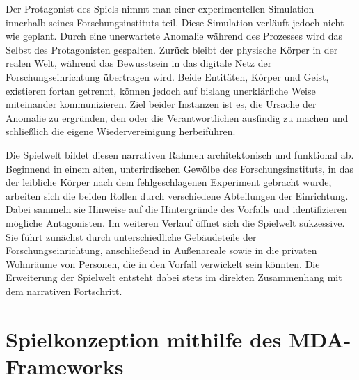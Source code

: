 Der Protagonist des Spiels nimmt man einer experimentellen Simulation innerhalb seines Forschungsinstituts teil. Diese Simulation verläuft jedoch nicht wie geplant. Durch eine unerwartete Anomalie während des Prozesses wird das Selbst des Protagonisten gespalten. Zurück bleibt der physische Körper in der realen Welt, während das Bewusstsein in das digitale Netz der Forschungseinrichtung übertragen wird. Beide Entitäten, Körper und Geist, existieren fortan getrennt, können jedoch auf bislang unerklärliche Weise miteinander kommunizieren. Ziel beider Instanzen ist es, die Ursache der Anomalie zu ergründen, den oder die Verantwortlichen ausfindig zu machen und schließlich die eigene Wiedervereinigung herbeiführen.

Die Spielwelt bildet diesen narrativen Rahmen architektonisch und funktional ab. Beginnend in einem alten, unterirdischen Gewölbe des Forschungsinstituts, in das der leibliche Körper nach dem fehlgeschlagenen Experiment gebracht wurde, arbeiten sich die beiden Rollen durch verschiedene Abteilungen der Einrichtung. Dabei sammeln sie Hinweise auf die Hintergründe des Vorfalls und identifizieren mögliche Antagonisten. Im weiteren Verlauf öffnet sich die Spielwelt sukzessive. Sie führt zunächst durch unterschiedliche Gebäudeteile der Forschungseinrichtung, anschließend in Außenareale sowie in die privaten Wohnräume von Personen, die in den Vorfall verwickelt sein könnten. Die Erweiterung der Spielwelt entsteht dabei stets im direkten Zusammenhang mit dem narrativen Fortschritt.


\section{Spielkonzeption mithilfe des MDA-Frameworks}



